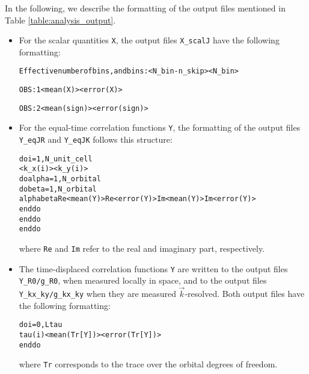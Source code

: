 %
In the following, we describe the formatting of the output files mentioned in Table \ref{table:analysis_output}.
\begin{itemize}
\item For the scalar quantities \texttt{X}, the output files  \texttt{X\_scalJ} have the following formatting:
\begin{alltt}
Effective number of bins, and bins:           <N_bin - n_skip>          <N_bin>

OBS :    1      <mean(X)>      <error(X)>

OBS :    2      <mean(sign)>   <error(sign)>
\end{alltt}

\item For the equal-time correlation functions \texttt{Y}, the formatting of the output files \texttt{Y\_eqJR} and \texttt{Y\_eqJK} follows this structure:
\begin{alltt}
do i = 1, N_unit_cell
   <k_x(i)>   <k_y(i)>
   do alpha = 1, N_orbital
   do beta  = 1, N_orbital
      alpha   beta   Re<mean(Y)>   Re<error(Y)>   Im<mean(Y)>   Im<error(Y)>
   enddo
   enddo
enddo
\end{alltt}
where \texttt{Re} and \texttt{Im} refer to the real and imaginary part, respectively.

\item The time-displaced correlation functions \texttt{Y} are written to the output files \texttt{Y\_R0/g\_R0}, when measured locally in space, 
and to the output files \texttt{Y\_kx\_ky/g\_kx\_ky} when they are measured $\vec{k}$-resolved. 
Both output files have the following formatting:
\begin{alltt}
do i = 0, Ltau
   tau(i)   <mean( Tr[Y] )>   <error( Tr[Y])>
enddo
\end{alltt}
where \texttt{Tr} corresponds to the trace over the orbital degrees of freedom.

\end{itemize}
